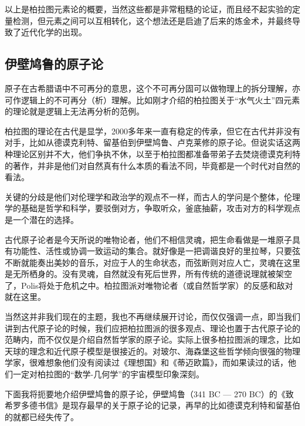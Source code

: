 以上是柏拉图元素论的概要，当然这些都是非常粗糙的论证，而且经不起实验的定量检测，但元素之间可以互相转化，这个想法还是启迪了后来的炼金术，并最终导致了近代化学的出现。


\subsection{伊壁鸠鲁的原子论}

原子在古希腊语中不可再分的意思，这个不可再分固可以做物理上的拆分理解，亦可作逻辑上的不可再分（析）理解。比如刚才介绍的柏拉图关于“水气火土”四元素的理论就是逻辑上无法再分析的范例。

柏拉图的理论在古代是显学，2000多年来一直有稳定的传承，但它在古代并非没有对手，比如从德谟克利特、留基伯到伊壁鸠鲁、卢克莱修的原子论。但说实话这两种理论区别并不大，他们争执不休，以至于柏拉图都准备带弟子去焚烧德谟克利特的著作，并非是他们对自然真有什么本质的看法不同，毕竟都是一个时代对自然的看法。

关键的分歧是他们对伦理学和政治学的观点不一样，而古人的学问是个整体，伦理学的基础是哲学和科学，要驳倒对方，争取听众，釜底抽薪，攻击对方的科学观点是一个潜在的选择。

古代原子论者是今天所说的唯物论者，他们不相信灵魂，把生命看做是一堆原子具有功能性、活性或协调一致运动的集合。就好像是一把调谐良好的里拉琴，只要弦不断就能奏出美妙的音乐，对应于人的生命状态，而弦断则对应人亡，灵魂在这里是无所栖身的。没有灵魂，自然就没有死后世界，所有传统的道德说理就被架空了，Polis将处于危机之中。柏拉图派对唯物论者（或自然哲学家）的反感和敌对就在这里。

当然这并非我们现在的主题，我也不再继续展开讨论，而仅仅强调一点，即当我们讲到古代原子论的时候，我们应把柏拉图派的很多观点、理论也置于古代原子论的范畴内，而不仅仅是介绍自然哲学家的原子论。实际上很多柏拉图派的理念，比如天球的理念和近代原子模型是很接近的。对玻尔、海森堡这些哲学倾向很强的物理学家，很难想象他们没有阅读过《理想国》和《蒂迈欧篇》，而如果读过的话，他们一定对柏拉图的“数学-几何学”的宇宙模型印象深刻。

下面我将扼要地介绍伊壁鸠鲁的原子论，伊壁鸠鲁（341 BC — 270 BC）的《致希罗多德书信》是现存最早的关于原子论的记录，再早的比如德谟克利特和留基伯的就都已经失传了。

